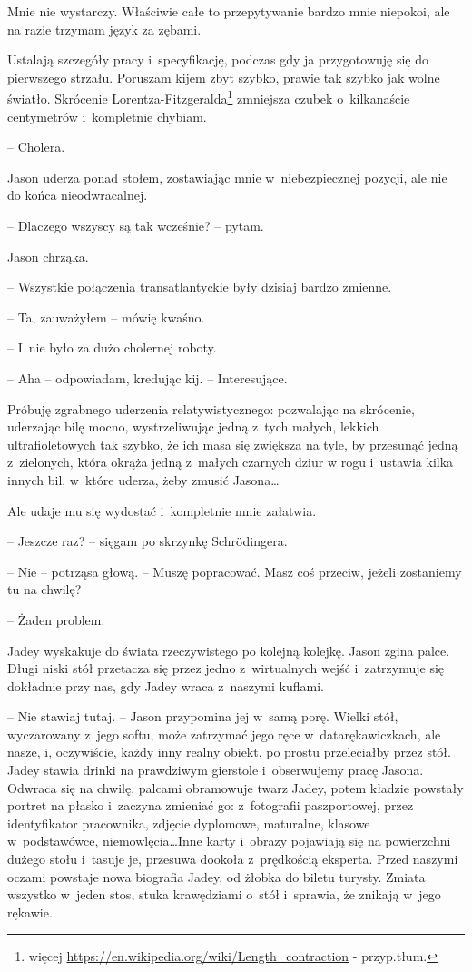 \documentclass[oneside,polish,12pt,sfheadings]{mwbk}
\begin{document}
Mnie nie wystarczy. Właściwie całe to przepytywanie bardzo mnie
niepokoi, ale na razie trzymam język za zębami.

Ustalają szczegóły pracy i~specyfikację, podczas gdy ja przygotowuję się
do pierwszego strzału. Poruszam kijem zbyt szybko, prawie tak szybko jak
wolne światło. Skrócenie
Lorentza-Fitzgeralda\footnote{więcej
\url{https://en.wikipedia.org/wiki/Length\_contraction} - przyp.tłum.}
zmniejsza czubek o~kilkanaście centymetrów i~kompletnie chybiam.

-- Cholera.

Jason uderza ponad stołem, zostawiając mnie w~niebezpiecznej pozycji,
ale nie do końca nieodwracalnej.

-- Dlaczego wszyscy są tak wcześnie? -- pytam.

Jason chrząka. 

-- Wszystkie połączenia transatlantyckie były dzisiaj
bardzo zmienne.

-- Ta, zauważyłem -- mówię kwaśno.

-- I~nie było za dużo cholernej roboty.

-- Aha -- odpowiadam, kredując kij. -- Interesujące.

Próbuję zgrabnego uderzenia relatywistycznego: pozwalając na skrócenie,
uderzając bilę mocno, wystrzeliwując jedną z~tych małych, lekkich
ultrafioletowych tak szybko, że ich masa się zwiększa na tyle, by
przesunąć jedną z~zielonych, która okrąża jedną z~małych czarnych dziur
w rogu i~ustawia kilka innych bil, w~które uderza, żeby zmusić Jasona\ldots

Ale udaje mu się wydostać i~kompletnie mnie załatwia.

-- Jeszcze raz? -- sięgam po skrzynkę Schrödingera.

-- Nie -- potrząsa głową. -- Muszę popracować. Masz coś przeciw, jeżeli
zostaniemy tu na chwilę?

-- Żaden problem.

Jadey wyskakuje do świata rzeczywistego po kolejną kolejkę. Jason zgina
palce. Długi niski stół przetacza się przez jedno z~wirtualnych wejść i~zatrzymuje się dokładnie przy nas, gdy Jadey wraca z~naszymi kuflami.

-- Nie stawiaj tutaj. -- Jason przypomina jej w~samą porę. Wielki
stół, wyczarowany z~jego softu, może zatrzymać jego ręce w~datarękawiczkach, ale nasze, i, oczywiście, każdy inny realny obiekt, po
prostu przeleciałby przez stół. Jadey stawia drinki na prawdziwym
gierstole i~obserwujemy pracę Jasona. Odwraca się na chwilę, palcami
obramowuje twarz Jadey, potem kładzie powstały portret na płasko i~zaczyna zmieniać go: z~fotografii paszportowej, przez identyfikator
pracownika, zdjęcie dyplomowe, maturalne, klasowe w~podstawówce,
niemowlęcia\ldots Inne karty i~obrazy pojawiają się na powierzchni dużego
stołu i~tasuje je, przesuwa dookoła z~prędkością eksperta. Przed naszymi
oczami powstaje nowa biografia Jadey, od żłobka do biletu turysty.
Zmiata wszystko w~jeden stos, stuka krawędziami o~stół i~sprawia, że
znikają w~jego rękawie.
\end{document}
